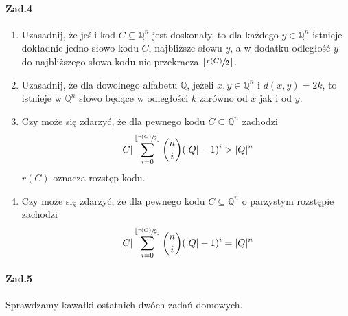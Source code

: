 \documentclass[a4paper,12pt]{article}
\newcommand\floor[1]{\lfloor#1\rfloor} %
\theoremstyle{definition}%
\theoremstyle{definition}
\theoremstyle{problem}
\begin{document}
\paragraph{Zad.4}
\begin{enumerate}[label=\alph*)]
\item Uzasadnij, że jeśli kod $C \subseteq \mathbb{Q}^n$ jest doskonały, to dla każdego $y\in \mathbb{Q}^n$ istnieje dokładnie jedno słowo kodu $C$, najbliższe słowu $y$, a w dodatku odległość $y$ do najbliższego słowa kodu nie przekracza $\floor{\sfrac{r(C)}{2}}$.
\item Uzasadnij, że dla dowolnego alfabetu $\mathbb{Q}$, jeżeli $x,y\in \mathbb{Q}^n$ i $d(x, y) = 2k$, to istnieje w $\mathbb{Q}^n$ słowo będące w odległości $k$ zarówno od $x$ jak i od $y$.
\item Czy może się zdarzyć, że dla pewnego kodu $C \subseteq \mathbb{Q}^n$ zachodzi
$$|C|\sum_{i=0}^{\floor{\sfrac{r(C)}{2}}}\binom{n}{i}(|Q|-1)^i>|Q|^n$$
$r(C)$ oznacza rozstęp kodu.
\item Czy może się zdarzyć, że dla pewnego kodu $C \subseteq \mathbb{Q}^n$ o parzystym rozstępie zachodzi
$$|C|\sum_{i=0}^{\floor{\sfrac{r(C)}{2}}}\binom{n}{i}(|Q|-1)^i=|Q|^n$$
\end{enumerate}

\paragraph{Zad.5} Sprawdzamy kawałki ostatnich dwóch zadań domowych.


\end{document}
